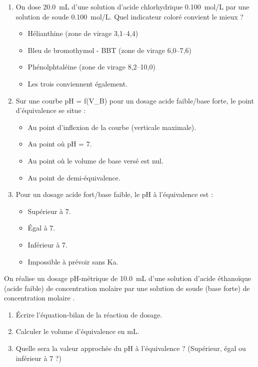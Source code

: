 \documentclass[11pt]{article}
\begin{document}
\begin{exercice}
\begin{enumerate}
    \item On dose \SI{20,0}{mL} d'une solution d'acide chlorhydrique \SI{0,100}{mol/L} par une solution de soude \SI{0,100}{mol/L}. Quel indicateur coloré convient le mieux ?
    \begin{itemize}
        \item[A.] Hélianthine (zone de virage 3,1--4,4)
        \item[B.] Bleu de bromothymol - BBT (zone de virage 6,0--7,6)
        \item[C.] Phénolphtaléine (zone de virage 8,2--10,0)
        \item[D.] Les trois conviennent également.
    \end{itemize}
    \item Sur une courbe pH = f(V\_B) pour un dosage acide faible/base forte, le point d'équivalence se situe :
    \begin{itemize}
        \item[A.] Au point d'inflexion de la courbe (verticale maximale).
        \item[B.] Au point où pH = 7.
        \item[C.] Au point où le volume de base versé est nul.
        \item[D.] Au point de demi-équivalence.
    \end{itemize}
    \item Pour un dosage acide fort/base faible, le pH à l'équivalence est :
    \begin{itemize}
        \item[A.] Supérieur à 7.
        \item[B.] Égal à 7.
        \item[C.] Inférieur à 7.
        \item[D.] Impossible à prévoir sans Ka.
    \end{itemize}
\end{enumerate}
\end{exercice}

\begin{exercice}
On réalise un dosage pH-métrique de \SI{10,0}{mL} d'une solution d'acide éthanoïque (acide faible) de concentration molaire  par une solution de soude (base forte) de concentration molaire .
\begin{enumerate}
    \item Écrire l'équation-bilan de la réaction de dosage.
    \item Calculer le volume d'équivalence  en mL.
    \item Quelle sera la valeur approchée du pH à l'équivalence ? (Supérieur, égal ou inférieur à 7 ?)
\end{enumerate}
\end{exercice}
\end{document}
